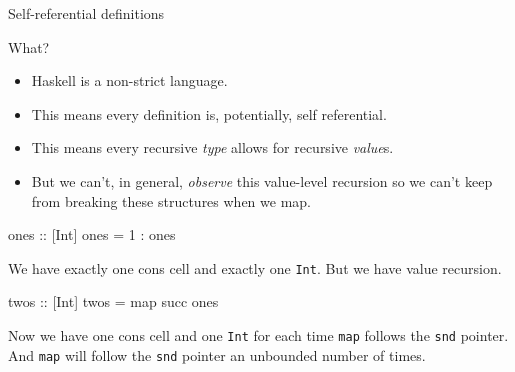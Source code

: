 \documentclass[ignorenonframetext]{beamer}
\newenvironment{Shaded}{}{}
\newcommand{\DataTypeTok}[1]{\textcolor[rgb]{0.56,0.13,0.00}{#1}}
\newcommand{\DecValTok}[1]{\textcolor[rgb]{0.25,0.63,0.44}{#1}}
\newcommand{\FunctionTok}[1]{\textcolor[rgb]{0.02,0.16,0.49}{#1}}
\newcommand{\NormalTok}[1]{#1}
\newcommand{\OtherTok}[1]{\textcolor[rgb]{0.00,0.44,0.13}{#1}}
\begin{document}
\begin{frame}{Self-referential definitions}
\begin{frame}[fragile]
\end{frame}

\begin{frame}

What?

\end{frame}

\begin{frame}

\begin{itemize}
\item
  Haskell is a non-strict language.
\item
  This means every definition is, potentially, self referential.
\item
  This means every recursive \emph{type} allows for recursive
  \emph{value}s.
\item
  But we can’t, in general, \emph{observe} this value-level recursion so
  we can’t keep from breaking these structures when we map.
\end{itemize}

\end{frame}

\begin{frame}[fragile]

\begin{Shaded}
\begin{Highlighting}[]
\OtherTok{ones ::}\NormalTok{ [}\DataTypeTok{Int}\NormalTok{]}
\NormalTok{ones }\FunctionTok{=} \DecValTok{1} \FunctionTok{:}\NormalTok{ ones}
\end{Highlighting}
\end{Shaded}

We have exactly one cons cell and exactly one \texttt{Int}. But we have
value recursion.

\end{frame}

\begin{frame}[fragile]

\begin{Shaded}
\begin{Highlighting}[]
\OtherTok{twos ::}\NormalTok{ [}\DataTypeTok{Int}\NormalTok{]}
\NormalTok{twos }\FunctionTok{=}\NormalTok{ map succ ones}
\end{Highlighting}
\end{Shaded}

Now we have one cons cell and one \texttt{Int} for each time
\texttt{map} follows the \texttt{snd} pointer. And \texttt{map} will
follow the \texttt{snd} pointer an unbounded number of times.


\end{frame}
\end{frame}
\end{document}
